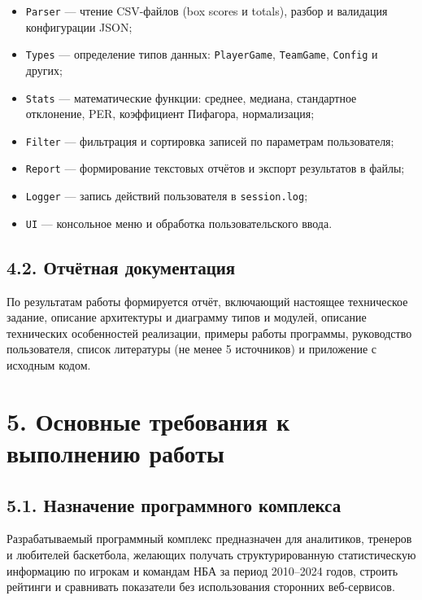 \documentclass[a4paper, final]{article}
\begin{document}
\begin{itemize}
    \item \texttt{Parser} — чтение CSV-файлов (box scores и totals), разбор и валидация конфигурации JSON;
    \item \texttt{Types} — определение типов данных: \texttt{PlayerGame}, \texttt{TeamGame}, \texttt{Config} и других;
    \item \texttt{Stats} — математические функции: среднее, медиана, стандартное отклонение, PER, коэффициент Пифагора, нормализация;
    \item \texttt{Filter} — фильтрация и сортировка записей по параметрам пользователя;
    \item \texttt{Report} — формирование текстовых отчётов и экспорт результатов в файлы;
    \item \texttt{Logger} — запись действий пользователя в \texttt{session.log};
    \item \texttt{UI} — консольное меню и обработка пользовательского ввода.
\end{itemize}

\subsection*{4.2. Отчётная документация}

По результатам работы формируется отчёт, включающий настоящее техническое задание, описание архитектуры и диаграмму типов и модулей, описание технических особенностей реализации, примеры работы программы, руководство пользователя, список литературы (не менее 5 источников) и приложение с исходным кодом.

\newpage

\section*{5. Основные требования к выполнению работы}

\subsection*{5.1. Назначение программного комплекса}

Разрабатываемый программный комплекс предназначен для аналитиков, тренеров и любителей баскетбола, желающих получать структурированную статистическую информацию по игрокам и командам НБА за период 2010--2024 годов, строить рейтинги и сравнивать показатели без использования сторонних веб-сервисов.
\end{document}
